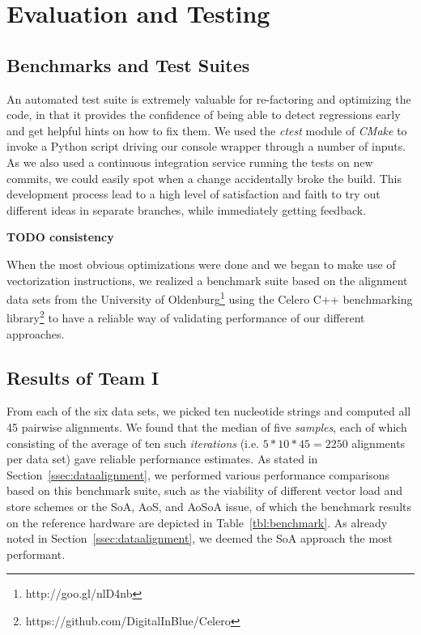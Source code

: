 \documentclass[runningheads,a4paper]{llncs}
\begin{document}
\section{Evaluation and Testing}
\label{sec:evaluation}

\subsection{Benchmarks and Test Suites}
\label{ssec:benchmark}

An automated test suite is extremely valuable for re-factoring and optimizing the code, in that it provides the confidence of being able to detect regressions early and get helpful hints on how to fix them. We used the \textit{ctest} module of \textit{CMake} to invoke a Python script driving our console wrapper through a number of inputs. As we also used a continuous integration service running the tests on new commits, we could easily spot when a change accidentally broke the build. This development process lead to a high level of satisfaction and faith to try out different ideas in separate branches, while immediately getting feedback.

{\bf TODO consistency}

When the most obvious optimizations were done and we began to make use of vectorization instructions, we realized a benchmark suite based on the alignment data sets from the University of Oldenburg\footnote{http://goo.gl/nlD4nb} using the Celero C++ benchmarking library\footnote{https://github.com/DigitalInBlue/Celero} to have a reliable way of validating performance of our different approaches.

\subsection{Results of Team I}

From each of the six data sets, we picked ten nucleotide strings and computed all 45 pairwise alignments. We found that the median of five \textit{samples}, each of which consisting of the average of ten such \textit{iterations} (i.e. $5*10*45 = 2250$ alignments per data set) gave reliable performance estimates. As stated in Section~\ref{ssec:dataalignment}, we performed various performance comparisons based on this benchmark suite, such as the viability of different vector load and store schemes or the SoA, AoS, and AoSoA issue, of which the benchmark results on the reference hardware are depicted in Table~\ref{tbl:benchmark}. As already noted in Section~\ref{ssec:dataalignment}, we deemed the SoA approach the most performant.
\end{document}
